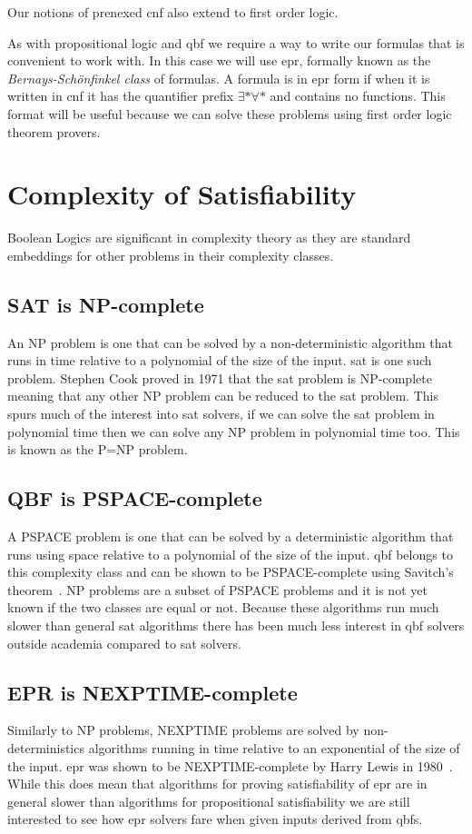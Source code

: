 Our notions of prenexed \gls{cnf} also extend to first order logic.

As with propositional logic and \gls{qbf} we require a way to write our formulas that is convenient to work with. In this case we will use \gls{epr}, formally known as the \textit{Bernays-Sch{\"o}nfinkel class} of formulas. A formula is in \gls{epr} form if when it is written in \gls{cnf} it has the quantifier prefix $\exists * \forall *$ and contains no functions. This format will be useful because we can solve these problems using first order logic theorem provers.

\section{Complexity of Satisfiability}
Boolean Logics are significant in complexity theory as they are standard embeddings for other problems in their complexity classes.

\subsection{SAT is NP-complete}
An NP problem is one that can be solved by a non-deterministic algorithm that runs in time relative to a polynomial of the size of the input. \Gls{sat} is one such problem. Stephen Cook proved in 1971 that the \gls{sat} problem is NP-complete~\cite{cookstheorem} meaning that any other NP problem can be reduced to the \gls{sat} problem. This spurs much of the interest into \gls{sat} solvers, if we can solve the \gls{sat} problem in polynomial time then we can solve any NP problem in polynomial time too. This is known as the P=NP problem.

\subsection{QBF is PSPACE-complete}
A PSPACE problem is one that can be solved by a deterministic algorithm that runs using space relative to a polynomial of the size of the input. \Gls{qbf} belongs to this complexity class and can be shown to be PSPACE-complete using Savitch's theorem~\cite{savitch}. NP problems are a subset of PSPACE problems and it is not yet known if the two classes are equal or not. Because these algorithms run much slower than general \gls{sat} algorithms there has been much less interest in \gls{qbf} solvers outside academia compared to \gls{sat} solvers.

\subsection{EPR is NEXPTIME-complete}
Similarly to NP problems, NEXPTIME problems are solved by non-deterministics algorithms running in time relative to an exponential of the size of the input. \Gls{epr} was shown to be NEXPTIME-complete by Harry Lewis in 1980~\cite{harrylewis}. While this does mean that algorithms for proving satisfiability of \gls{epr} are in general slower than algorithms for propositional satisfiability we are still interested to see how \gls{epr} solvers fare when given inputs derived from \glspl{qbf}.

